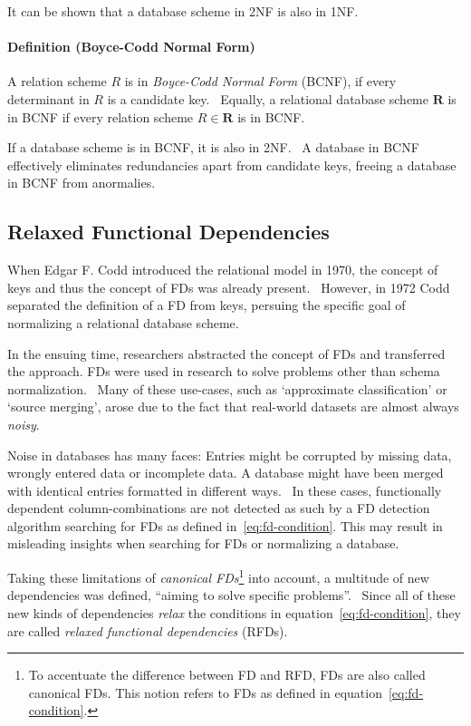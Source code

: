 It can be shown that a database scheme in 2NF is also in 1NF.~\cite[p.~58]{SCH17}

\paragraph{Definition (Boyce-Codd Normal Form)}
A relation scheme \( R \) is in \emph{Boyce-Codd Normal Form} (BCNF), if every determinant in \( R \) is a candidate key.~\cite[p.~65]{SCH17}
Equally, a relational database scheme \( \textbf{R} \) is in BCNF if every relation scheme \( R \in \textbf{R} \) is in BCNF.\

If a database scheme is in BCNF, it is also in 2NF.~\cite[p.~58]{SCH17} A database in BCNF effectively eliminates redundancies apart from candidate keys, freeing a database in BCNF from anormalies.~\cite[p.~67]{SCH17}


\subsection{Relaxed Functional Dependencies}
When Edgar F. Codd introduced the relational model in 1970, the concept of keys and thus the concept of FDs was already present.~\cite[p.~70]{MAI83}
However, in 1972 Codd separated the definition of a FD from keys, persuing the specific goal of normalizing a relational database scheme.

In the ensuing time, researchers abstracted the concept of FDs and transferred the approach.
FDs were used in research to solve problems other than schema normalization.~\cite[p.~161]{CAR16}
Many of these use-cases, such as `approximate classification' or `source merging', arose due to the fact that real-world datasets are almost always \emph{noisy}.

Noise in databases has many faces:
Entries might be corrupted by missing data, wrongly entered data or incomplete data.
A database might have been merged with identical entries formatted in different ways.~\cite[p.~1]{KOU09}
In these cases, functionally dependent column-combinations are not detected as such by a FD detection algorithm searching for FDs as defined in~\ref{eq:fd-condition}.
This may result in misleading insights when searching for FDs or normalizing a database.

Taking these limitations of \emph{canonical FDs}\footnote{To accentuate the difference between FD and RFD, FDs are also called canonical FDs. This notion refers to FDs as defined in equation~\ref{eq:fd-condition}.} into account, a multitude of new dependencies was defined, ``aiming to solve specific problems''.~\cite[p.~147]{CAR16}
Since all of these new kinds of dependencies \emph{relax} the conditions in equation~\ref{eq:fd-condition}, they are called \emph{relaxed functional dependencies} (RFDs).

